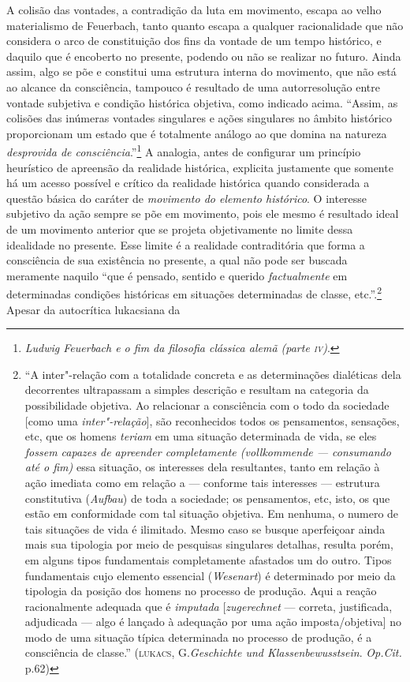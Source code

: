 A colisão das vontades, a contradição da luta em movimento, escapa ao
velho materialismo de Feuerbach, tanto quanto escapa a qualquer
racionalidade que não considera o arco de constituição dos fins da
vontade de um tempo histórico, e daquilo que é encoberto no presente,
podendo ou não se realizar no futuro. Ainda assim, algo se põe e
constitui uma estrutura interna do movimento, que não está ao alcance da
consciência, tampouco é resultado de uma autorresolução entre vontade
subjetiva e condição histórica objetiva, como indicado acima. ``Assim,
as colisões das inúmeras vontades singulares e ações singulares no
âmbito histórico proporcionam um estado que é totalmente análogo ao que
domina na natureza \emph{desprovida de consciência}.''\footnote{\emph{Ludwig
  Feuerbach e o fim da filosofia clássica alemã (parte \textsc{iv})}.} A
analogia, antes de configurar um princípio heurístico de apreensão da
realidade histórica, explicita justamente que somente há um acesso
possível e crítico da realidade histórica quando considerada a questão
básica do caráter de \emph{movimento do elemento histórico}. O interesse
subjetivo da ação sempre se põe em movimento, pois ele mesmo é resultado
ideal de um movimento anterior que se projeta objetivamente no limite
dessa idealidade no presente. Esse limite é a realidade contraditória
que forma a consciência de sua existência no presente, a qual não pode
ser buscada meramente naquilo ``que é pensado, sentido e querido
\emph{factualmente} em determinadas condições históricas em situações
determinadas de classe, etc.''.\footnote{``A inter"-relação com a
  totalidade concreta e as determinações dialéticas dela decorrentes
  ultrapassam a simples descrição e resultam na categoria da
  possibilidade objetiva. Ao relacionar a consciência com o todo da
  sociedade {[}como uma \emph{inter"-relação}{]}, são reconhecidos todos
  os pensamentos, sensações, etc, que os homens \emph{teriam} em uma
  situação determinada de vida, se eles \emph{fossem capazes de
  apreender completamente (vollkommende --- consumando até o fim)} essa
  situação, os interesses dela resultantes, tanto em relação à ação
  imediata como em relação a --- conforme tais interesses --- estrutura
  constitutiva (\emph{Aufbau}) de toda a sociedade; os pensamentos, etc,
  isto, os que estão em conformidade com tal situação objetiva. Em
  nenhuma, o numero de tais situações de vida é ilimitado. Mesmo caso se
  busque aperfeiçoar ainda mais sua tipologia por meio de pesquisas
  singulares detalhas, resulta porém, em alguns tipos fundamentais
  completamente afastados um do outro. Tipos fundamentais cujo elemento
  essencial (\emph{Wesenart}) é determinado por meio da tipologia da
  posição dos homens no processo de produção. Aqui a reação
  racionalmente adequada que é \emph{imputada}
  {[}\emph{zugerechnet} --- correta, justificada, adjudicada
  --- algo é lançado à adequação por uma ação
  imposta/objetiva{]} no modo de uma situação típica
  determinada no processo de produção, é a consciência de classe.''
  (\textsc{lukacs}, G.\emph{Geschichte und Klassenbewusstsein}.
  \emph{Op.Cit.} p.62)} Apesar da autocrítica lukacsiana da
